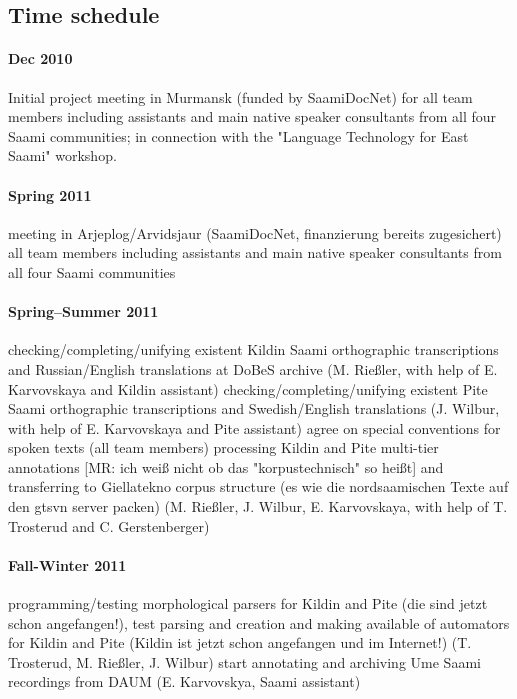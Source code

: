 \documentclass[a4paper,12pt]{article}
\begin{document}
{{{{\subsection{Time schedule}%

\paragraph{Dec 2010}Initial project meeting in Murmansk (funded by SaamiDocNet) for all team members including assistants and main native speaker consultants from all four Saami communities; in connection with the "Language Technology for East Saami" workshop.

\paragraph{Spring 2011}meeting in Arjeplog/Arvidsjaur (SaamiDocNet, finanzierung bereits zugesichert)
all team members including assistants and main native speaker consultants from all four Saami communities

\paragraph{Spring–Summer 2011}
checking/completing/unifying existent Kildin Saami orthographic transcriptions and Russian/English translations at DoBeS archive 
(M. Rießler, with help of E. Karvovskaya and Kildin assistant)
checking/completing/unifying existent Pite Saami orthographic transcriptions and Swedish/English translations
(J. Wilbur, with help of E. Karvovskaya and Pite assistant)
agree on special conventions for spoken texts
(all team members)
processing Kildin and Pite multi-tier annotations [MR: ich weiß nicht ob das "korpustechnisch" so heißt] and transferring to Giellatekno corpus structure (es wie die nordsaamischen Texte auf den gtsvn server packen)
(M. Rießler, J. Wilbur, E. Karvovskaya, with help of T. Trosterud and C. Gerstenberger)

\paragraph{Fall-Winter 2011}
programming/testing morphological parsers for Kildin and Pite (die sind jetzt schon angefangen!), test parsing and creation and making available of automators for Kildin and Pite (Kildin ist jetzt schon angefangen und im Internet!)
(T. Trosterud, M. Rießler, J. Wilbur)
start annotating and archiving Ume Saami recordings from DAUM (E. Karvovskya, Saami assistant)

}}}}
\end{document}
